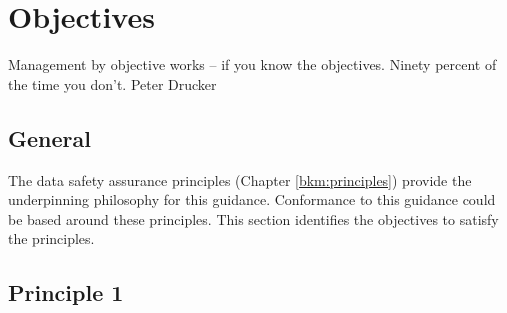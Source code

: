 %
%
\chapter{Objectives \label{bkm:objectives}}

\dsiwgSectionQuote
  {Management by objective works -- if you know the objectives. Ninety percent of the time you don't.}
  {Peter Drucker}
\section{General}

The data safety assurance principles (Chapter \ref{bkm:principles}) provide the underpinning philosophy for this guidance. Conformance to this guidance could be based around these principles. This section identifies the objectives to satisfy the principles.


\section{Principle 1}


